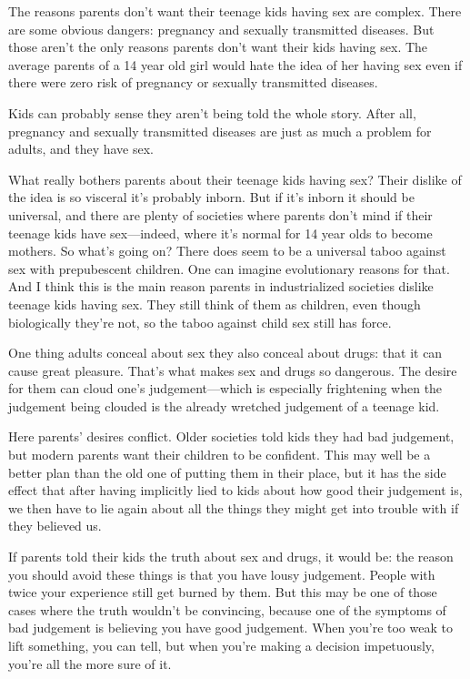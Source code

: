 \documentclass[12pt]{book}
\begin{document}
The reasons parents don't want their teenage kids having sex are
complex. There are some obvious dangers: pregnancy and sexually
transmitted diseases. But those aren't the only reasons parents don't
want their kids having sex. The average parents of a 14 year old girl
would hate the idea of her having sex even if there were zero risk of
pregnancy or sexually transmitted diseases.

Kids can probably sense they aren't being told the whole story. After
all, pregnancy and sexually transmitted diseases are just as much a
problem for adults, and they have sex.

What really bothers parents about their teenage kids having sex? Their
dislike of the idea is so visceral it's probably inborn. But if it's
inborn it should be universal, and there are plenty of societies where
parents don't mind if their teenage kids have sex---indeed, where it's
normal for 14 year olds to become mothers. So what's going on? There
does seem to be a universal taboo against sex with prepubescent
children. One can imagine evolutionary reasons for that. And I think
this is the main reason parents in industrialized societies dislike
teenage kids having sex. They still think of them as children, even
though biologically they're not, so the taboo against child sex still
has force.

One thing adults conceal about sex they also conceal about drugs: that
it can cause great pleasure. That's what makes sex and drugs so
dangerous. The desire for them can cloud one's judgement---which is
especially frightening when the judgement being clouded is the already
wretched judgement of a teenage kid.

Here parents' desires conflict. Older societies told kids they had bad
judgement, but modern parents want their children to be confident. This
may well be a better plan than the old one of putting them in their
place, but it has the side effect that after having implicitly lied to
kids about how good their judgement is, we then have to lie again about
all the things they might get into trouble with if they believed us.

If parents told their kids the truth about sex and drugs, it would be:
the reason you should avoid these things is that you have lousy
judgement. People with twice your experience still get burned by them.
But this may be one of those cases where the truth wouldn't be
convincing, because one of the symptoms of bad judgement is believing
you have good judgement. When you're too weak to lift something, you can
tell, but when you're making a decision impetuously, you're all the more
sure of it.
\end{document}
